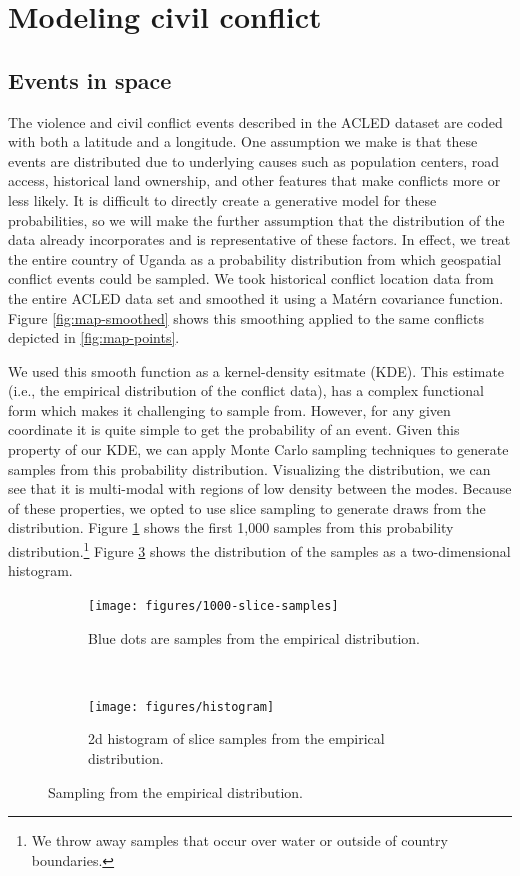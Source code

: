 \documentclass{article} %
\begin{document}
\section{Modeling civil conflict}

\subsection{Events in space}

The violence and civil conflict events described in the ACLED dataset are coded with both a latitude and a longitude. One assumption we make is that these events are distributed due to underlying causes such as population centers, road access, historical land ownership, and other features that make conflicts more or less likely. It is difficult to directly create a generative model for these probabilities, so we will make the further assumption that the distribution of the data already incorporates and is representative of these factors. In effect, we treat the entire country of Uganda as a probability distribution from which geospatial conflict events could be sampled.  We took historical conflict location data from the entire ACLED data set and smoothed it using a Mat\'{e}rn covariance function.  Figure \ref{fig:map-smoothed} shows this smoothing applied to the same conflicts depicted in \ref{fig:map-points}.

We used this smooth function as a kernel-density esitmate (KDE). This estimate (i.e., the empirical distribution of the conflict data), has a complex functional form which makes it challenging to sample from. However, for any given coordinate it is quite simple to get the probability of an event. Given this property of our KDE, we can apply Monte Carlo sampling techniques to generate samples from this probability distribution. Visualizing the distribution, we can see that it is multi-modal with regions of low density between the modes. Because of these properties, we opted to use slice sampling to generate draws from the distribution. Figure \ref{fig:sampled-conflicts} shows the first 1,000 samples from this probability distribution.\footnote{We throw away samples that occur over water or outside of country boundaries.} Figure \ref{fig:histogram} shows the distribution of the samples as a two-dimensional histogram.

\begin{figure}
  \centering
  \begin{subfigure}[b]{0.5\textwidth}
    \centering
    \texttt{[image: figures/1000-slice-samples]}
    \caption{Blue dots are samples from the empirical distribution.}
    \label{fig:sampled-conflicts}
  \end{subfigure}~\begin{subfigure}[b]{0.5\textwidth}
    \centering
    \texttt{[image: figures/histogram]}
    \caption{2d histogram of slice samples from the empirical distribution.}
    \label{fig:histogram}
  \end{subfigure}
  \caption{Sampling from the empirical distribution.}
\end{figure}
\end{document}
